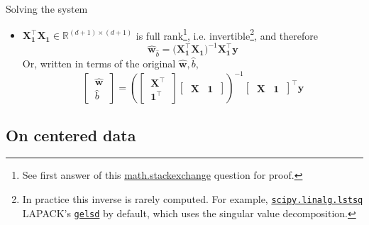 \documentclass{beamer}
\numberwithin{equation}{section}
\newcommand{\ahref}[2]{\href{#1}{\alert{#2}}}
\begin{document}
\begin{frame}{Solving the system}
\begin{itemize}
        \item
        $ \mathbf{X}_\mathbf{1}^\top\mathbf{X}_\mathbf{1} \in
        \mathbb{R}^{(d + 1) \times (d + 1)} $ is full rank\footnote{
            See first answer of this \ahref{
https://math.stackexchange.com/questions/349738/prove-operatornamerankata-operatornameranka-for-any-a-in-m-m-times-n}
            {math.stackexchange} question for proof.
        }, i.e. invertible\footnote{
            In practice this inverse is rarely computed. For example,
            \ahref{
https://docs.scipy.org/doc/scipy/reference/generated/scipy.linalg.lstsq.html
            }{\texttt{scipy.linalg.lstsq}} LAPACK's \ahref{
http://www.netlib.org/lapack/explore-html/db/d6a/dgelsd_8f.html
            }{\texttt{gelsd}} by default, which uses the singular value
            decomposition.
        },
        and therefore
        \begin{equation} \label{lr_ols_aug}
            \hat{\mathbf{w}}_{\hat{b}} = \big(
                \mathbf{X}_\mathbf{1}^\top\mathbf{X}_\mathbf{1}
            \big)^{-1}\mathbf{X}_\mathbf{1}^\top\mathbf{y}
        \end{equation}
        Or, written in terms of the original $ \hat{\mathbf{w}}, \hat{b} $,
        \begin{equation} \label{lr_ols_block}
            \begin{bmatrix}
                \ \hat{\mathbf{w}} \ \\ \ \hat{b} \
            \end{bmatrix} =
            \left(
                \begin{bmatrix}
                    \ \mathbf{X}^\top \ \\ \ \mathbf{1}^\top \
                \end{bmatrix}
                \begin{bmatrix}
                    \ \mathbf{X} & \mathbf{1} \
                \end{bmatrix}
            \right)^{-1}
            \begin{bmatrix}
                \ \mathbf{X} & \mathbf{1} \
            \end{bmatrix}^\top\mathbf{y}
        \end{equation}
    \end{itemize}
\end{frame}

\subsection{On centered data}
\end{document}
